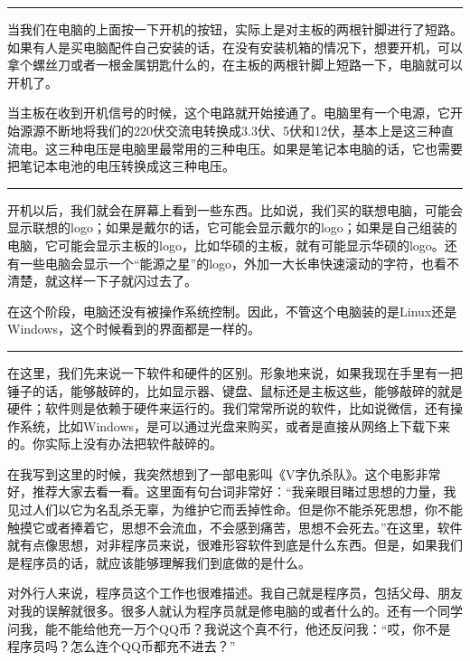 \documentclass[
  letterpaper,
  DIV=11,
  numbers=noendperiod]{scrreprt}
\begin{document}
\begin{center}\rule{0.5\linewidth}{0.5pt}\end{center}

当我们在电脑的上面按一下开机的按钮，实际上是对主板的两根针脚进行了短路。如果有人是买电脑配件自己安装的话，在没有安装机箱的情况下，想要开机，可以拿个螺丝刀或者一根金属钥匙什么的，在主板的两根针脚上短路一下，电脑就可以开机了。

当主板在收到开机信号的时候，这个电路就开始接通了。电脑里有一个电源，它开始源源不断地将我们的220伏交流电转换成3.3伏、5伏和12伏，基本上是这三种直流电。这三种电压是电脑里最常用的三种电压。如果是笔记本电脑的话，它也需要把笔记本电池的电压转换成这三种电压。

\begin{center}\rule{0.5\linewidth}{0.5pt}\end{center}

开机以后，我们就会在屏幕上看到一些东西。比如说，我们买的联想电脑，可能会显示联想的logo；如果是戴尔的话，它可能会显示戴尔的logo；如果是自己组装的电脑，它可能会显示主板的logo，比如华硕的主板，就有可能显示华硕的logo。还有一些电脑会显示一个``能源之星''的logo，外加一大长串快速滚动的字符，也看不清楚，就这样一下子就闪过去了。

在这个阶段，电脑还没有被操作系统控制。因此，不管这个电脑装的是Linux还是Windows，这个时候看到的界面都是一样的。

\begin{center}\rule{0.5\linewidth}{0.5pt}\end{center}

在这里，我们先来说一下软件和硬件的区别。形象地来说，如果我现在手里有一把锤子的话，能够敲碎的，比如显示器、键盘、鼠标还是主板这些，能够敲碎的就是硬件；软件则是依赖于硬件来运行的。我们常常所说的软件，比如说微信，还有操作系统，比如Windows，是可以通过光盘来购买，或者是直接从网络上下载下来的。你实际上没有办法把软件敲碎的。

在我写到这里的时候，我突然想到了一部电影叫《V字仇杀队》。这个电影非常好，推荐大家去看一看。这里面有句台词非常好：``我亲眼目睹过思想的力量，我见过人们以它为名乱杀无辜，为维护它而丢掉性命。但是你不能杀死思想，你不能触摸它或者捧着它，思想不会流血，不会感到痛苦，思想不会死去。''在这里，软件就有点像思想，对非程序员来说，很难形容软件到底是什么东西。但是，如果我们是程序员的话，就应该能够理解我们到底做的是什么。

对外行人来说，程序员这个工作也很难描述。我自己就是程序员，包括父母、朋友对我的误解就很多。很多人就认为程序员就是修电脑的或者什么的。还有一个同学问我，能不能给他充一万个QQ币？我说这个真不行，他还反问我：``哎，你不是程序员吗？怎么连个QQ币都充不进去？''
\end{document}
